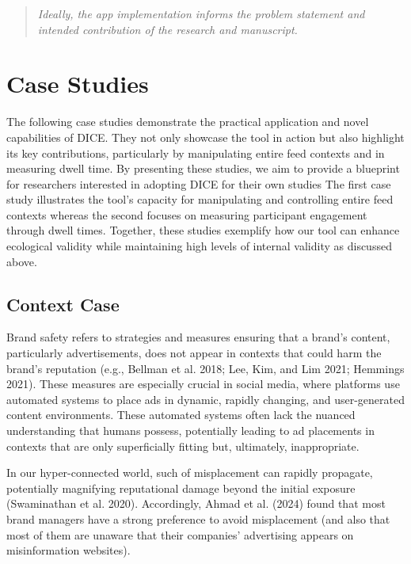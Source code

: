 \documentclass[
  a4paper,
]{scrreprt}
\begin{document}
\begin{quote}
\emph{Ideally, the app implementation informs the problem statement and
intended contribution of the research and manuscript.}
\end{quote}

\hypertarget{sec-dice-case-studies}{%
\section{Case Studies}\label{sec-dice-case-studies}}

The following case studies demonstrate the practical application and
novel capabilities of DICE. They not only showcase the tool in action
but also highlight its key contributions, particularly by manipulating
entire feed contexts and in measuring dwell time. By presenting these
studies, we aim to provide a blueprint for researchers interested in
adopting DICE for their own studies The first case study illustrates the
tool's capacity for manipulating and controlling entire feed contexts
whereas the second focuses on measuring participant engagement through
dwell times. Together, these studies exemplify how our tool can enhance
ecological validity while maintaining high levels of internal validity
as discussed above.

\hypertarget{context-case}{%
\subsection{Context Case}\label{context-case}}

Brand safety refers to strategies and measures ensuring that a brand's
content, particularly advertisements, does not appear in contexts that
could harm the brand's reputation (e.g., Bellman et al. 2018; Lee, Kim,
and Lim 2021; Hemmings 2021). These measures are especially crucial in
social media, where platforms use automated systems to place ads in
dynamic, rapidly changing, and user-generated content environments.
These automated systems often lack the nuanced understanding that humans
possess, potentially leading to ad placements in contexts that are only
superficially fitting but, ultimately, inappropriate.

In our hyper-connected world, such of misplacement can rapidly
propagate, potentially magnifying reputational damage beyond the initial
exposure (Swaminathan et al. 2020). Accordingly, Ahmad et al. (2024)
found that most brand managers have a strong preference to avoid
misplacement (and also that most of them are unaware that their
companies' advertising appears on misinformation websites).
\end{document}
